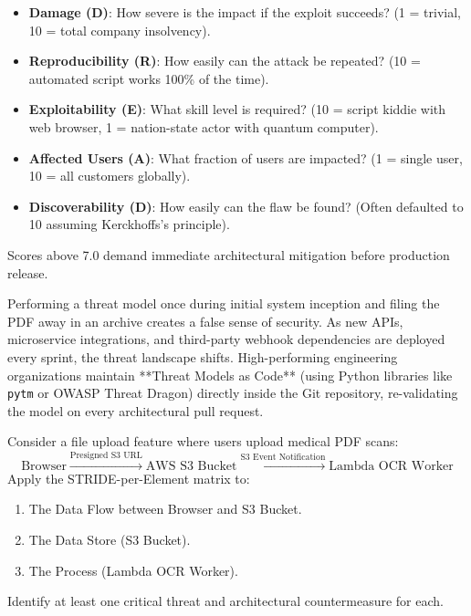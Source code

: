 \begin{itemize}[leftmargin=18pt]
  \item \textbf{Damage (D)}: How severe is the impact if the exploit succeeds? (1 = trivial, 10 = total company insolvency).
  \item \textbf{Reproducibility (R)}: How easily can the attack be repeated? (10 = automated script works 100\% of the time).
  \item \textbf{Exploitability (E)}: What skill level is required? (10 = script kiddie with web browser, 1 = nation-state actor with quantum computer).
  \item \textbf{Affected Users (A)}: What fraction of users are impacted? (1 = single user, 10 = all customers globally).
  \item \textbf{Discoverability (D)}: How easily can the flaw be found? (Often defaulted to 10 assuming Kerckhoffs's principle).
\end{itemize}
Scores above 7.0 demand immediate architectural mitigation before production release.

\begin{productionwarningbox}
Performing a threat model once during initial system inception and filing the PDF away in an archive creates a false sense of security. As new APIs, microservice integrations, and third-party webhook dependencies are deployed every sprint, the threat landscape shifts. High-performing engineering organizations maintain **Threat Models as Code** (using Python libraries like \texttt{pytm} or OWASP Threat Dragon) directly inside the Git repository, re-validating the model on every architectural pull request.
\end{productionwarningbox}

\begin{tryityourselfbox}
Consider a file upload feature where users upload medical PDF scans:
$$\text{Browser} \xrightarrow{\text{Presigned S3 URL}} \text{AWS S3 Bucket} \xrightarrow{\text{S3 Event Notification}} \text{Lambda OCR Worker}$$
Apply the STRIDE-per-Element matrix to:
\begin{enumerate}
  \item The Data Flow between Browser and S3 Bucket.
  \item The Data Store (S3 Bucket).
  \item The Process (Lambda OCR Worker).
\end{enumerate}
Identify at least one critical threat and architectural countermeasure for each.
\end{tryityourselfbox}

